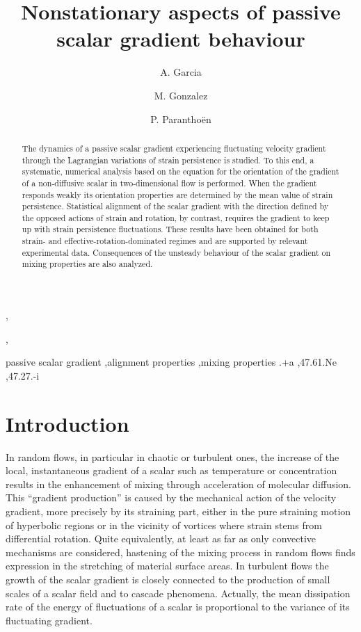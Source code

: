 \documentclass[doublespacing]{elsart}
\begin{document}
\begin{frontmatter}

\title{Nonstationary aspects of passive scalar gradient behaviour}

\author{A. Garcia},
\author{M. Gonzalez},
\author{P. Parantho\"en}
\address{CNRS, UMR 6614, Laboratoire de Thermodynamique, \\ 
CORIA, Site universitaire du Madrillet, \\ 
76801 Saint-Etienne du Rouvray, France}

\begin{abstract}
The dynamics of a passive scalar gradient experiencing
fluctuating velocity gradient through the Lagrangian
variations of strain persistence 
is studied.
To this end,
a systematic, numerical analysis based on the 
equation for the orientation 
of the gradient of a non-diffusive scalar in two-dimensional flow
is performed.
When the gradient responds
weakly
its orientation properties are determined by the mean 
value of strain persistence. Statistical alignment of the 
scalar gradient with the direction defined by the opposed
actions of strain and rotation, by contrast, requires the gradient to
keep up 
with strain persistence fluctuations.
These results 
have been obtained for both strain- and
effective-rotation-dominated regimes and 
are supported by relevant experimental data.
Consequences  
of
the unsteady behaviour of the scalar gradient
on mixing 
properties 
are also analyzed.
\end{abstract}

\begin{keyword}
passive scalar gradient \sep alignment properties
\sep mixing properties 
.+a \sep 47.61.Ne \sep 47.27.-i 
\end{keyword}

\end{frontmatter}

\section{Introduction}
\label{sec1}
In random flows, in particular in chaotic or turbulent ones,
the
increase
of the local, instantaneous gradient of a scalar
such as temperature or concentration results in the 
enhancement 
of mixing through acceleration of molecular diffusion.
This ``gradient production'' is caused by the mechanical action of
the velocity gradient, more precisely by 
its straining part, either in the pure straining motion of
hyperbolic regions or in the vicinity of vortices where 
strain stems from differential rotation.
Quite equivalently, at least as far as only convective
mechanisms are considered, 
hastening of the mixing process in random flows
finds expression
in the
stretching of material surface
areas. 
In turbulent flows the growth of the scalar gradient is 
closely connected to the production of small
scales of a scalar field
and to cascade phenomena.
Actually,
the mean dissipation rate of the energy of fluctuations
of a scalar is proportional to the variance of its fluctuating
gradient.
\end{document}
